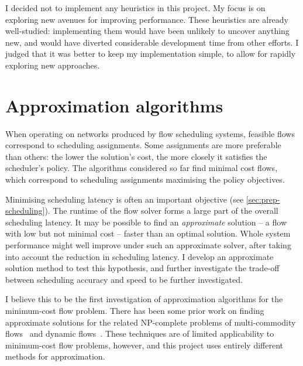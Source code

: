 I decided not to implement any heuristics in this project. My focus is on exploring new avenues for improving performance. These heuristics are already well-studied: implementing them would have been unlikely to uncover anything new, and would have diverted considerable development time from other efforts. I judged that it was better to keep my implementation simple, to allow for rapidly exploring new approaches.


\section{Approximation algorithms} \label{sec:impl-approx}

When operating on networks produced by flow scheduling systems, feasible flows correspond to scheduling assignments. Some assignments are more preferable than others: the lower the solution's cost, the more closely it satisfies the scheduler's policy. The algorithms considered so far find minimal cost flows, which correspond to scheduling assignments maximising the policy objectives.

Minimising scheduling latency is often an important objective (see \cref{sec:prep-scheduling}). The runtime of the flow solver forms a large part of the overall scheduling latency. It may be possible to find an \emph{approximate} solution -- a flow with low but not minimal cost -- faster than an optimal solution. Whole system performance might well improve under such an approximate solver, after taking into account the reduction in scheduling latency. I develop an approximate solution method to test this hypothesis, and further investigate the trade-off between scheduling accuracy and speed to be further investigated.

I believe this to be the first investigation of approximation algorithms for the minimum-cost flow problem. There has been some prior work on finding approximate solutions for the related NP-complete problems of multi-commodity flows~\cite{Garg:2007} and dynamic flows~\cite{Hoppe:1994}. These techniques are of limited applicability to minimum-cost flow problems\footnotemark, however, and this project uses entirely different methods for approximation.

